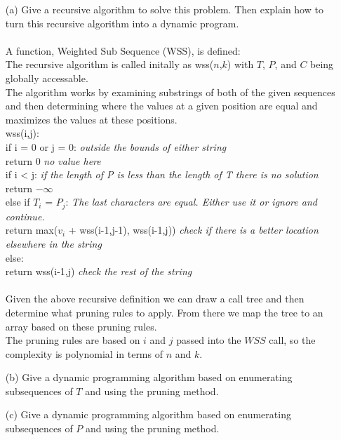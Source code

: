 \documentclass[10pt]{article}
\newcommand{\tab}{\hspace*{2em}}
\newcommand{\tabb}{\hspace*{4em}}
\begin{document}
	\begin{enumerate}
		\item[(a)]	Give a recursive algorithm to solve this problem. Then explain how to turn this recursive algorithm
					into a dynamic program.\\
					\\
					A function, Weighted Sub Sequence (WSS), is defined:\\
					The recursive algorithm is called initally as wss($n$,$k$) with $T$, $P$, and $C$ being globally accessable.\\
					The algorithm works by examining substrings of both of the given sequences and then determining where 
					the values at a given position are equal and maximizes the values at these positions. 
					\\
					wss(i,j):\\
					\tab if i = 0 or j = 0: \emph{outside the bounds of either string}\\
					\tabb return 0 \emph{no value here}\\
					\tab if i < j: \emph{if the length of P is less than the length of T there is no solution}\\
					\tabb return $- \infty$\\
					\tab else if $T_i$ = $P_j$: \emph{The last characters are equal. Either use it or ignore and continue.}\\
					\tabb return max($v_i$ + wss(i-1,j-1), wss(i-1,j)) \emph{check if there is a better location elsewhere in the string}\\
					\tab else:\\
					\tabb return wss(i-1,j) \emph{check the rest of the string}\\
					\\
					Given the above recursive definition we can draw a call tree and then determine what pruning rules
					to apply. From there we map the tree to an array based on these pruning rules.\\
					The pruning rules are based on $i$ and $j$ passed into the $WSS$ call, so the complexity
					is polynomial in terms of $n$ and $k$.\\
		\item[(b)]	Give a dynamic programming algorithm based on enumerating subsequences of $T$ and using the
					pruning method.\\
		\item[(c)]	Give a dynamic programming algorithm based on enumerating subsequences of $P$ and using the
					pruning method.
	\end{enumerate}
\end{document}
